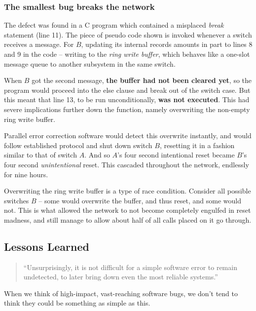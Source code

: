 \documentclass[compilation.tex]{subfiles}
\begin{document}
\subsubsection{The smallest bug breaks the network}

The defect was found in a \textsf{C} program which contained a misplaced \textit{break} statement (line 11).\supercite{att-dennisburke1995,att-popularscience1990}
The piece of pseudo code shown is invoked whenever a switch receives a message.\supercite{att-popularscience1990}
For $B$, updating its internal records amounts in part to lines 8 and 9 in the code -- writing to the \textsl{ring write buffer}, which behaves like a one-slot message queue to another subsystem in the same switch.

When $B$ got the second message, \textbf{the buffer had not been cleared yet}, so the program would proceed into the else clause and break out of the switch case.
But this meant that line 13, to be run unconditionally, \textbf{was not executed}.
This had severe implications further down the function, namely overwriting the non-empty ring write buffer.

Parallel error correction software would detect this overwrite instantly, and would follow established protocol and shut down switch $B$, resetting it in a fashion similar to that of switch $A$.
And so $A$'s four second intentional reset became $B$'s four second \emph{unintentional} reset.
This cascaded throughout the network, endlessly for nine hours.

Overwriting the ring write buffer is a type of race condition.
Consider all possible switches $B$ -- some would overwrite the buffer, and thus reset, and some would not.
This is what allowed the network to not become completely engulfed in reset madness, and still manage to allow about half of all calls placed on it go through.

\subsection{Lessons Learned}

\begin{quotation}
	``Unsurprisingly, it is not difficult for a simple software error to remain undetected, to later bring down even the most reliable systems.''\supercite{att-dennisburke1995}
\end{quotation}

When we think of high-impact, vast-reaching software bugs, we don't tend to think they could be something as simple as this.
\end{document}
